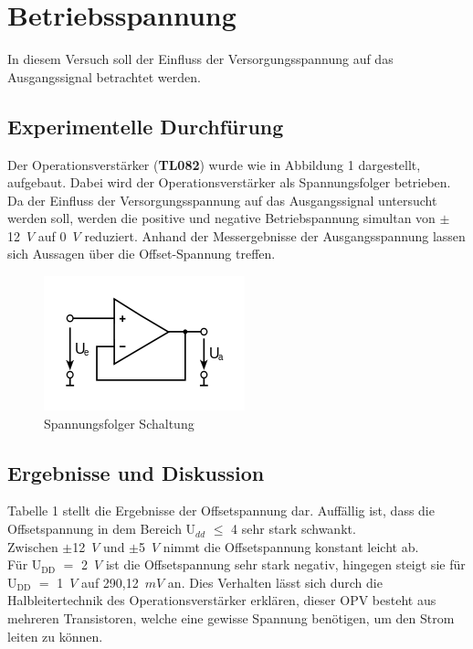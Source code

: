 \section{Betriebsspannung}
In diesem Versuch soll der Einfluss der Versorgungsspannung auf das
Ausgangssignal betrachtet werden. 
\subsection{Experimentelle Durchf\"urung}
\noindent
Der Operationsverst\"arker (\textbf{TL082}) wurde wie in Abbildung 1 dargestellt,  aufgebaut. Dabei wird der Operationsverst\"arker als Spannungsfolger betrieben. Da der Einfluss der Versorgungsspannung auf das Ausgangssignal untersucht werden soll, werden die positive und negative Betriebspannung simultan von $\pm$12~$V$ auf 0~$V$ reduziert. Anhand der Messergebnisse der Ausgangsspannung lassen sich Aussagen \"uber die Offset-Spannung treffen. 

\begin{figure}[!ht]
\begin{center}
\includegraphics[scale=1]{bild/spannungsfolger}
\caption{Spannungsfolger Schaltung}
\end{center}
\end{figure}
\newpage
\subsection{Ergebnisse und Diskussion}
Tabelle 1 stellt die Ergebnisse der Offsetspannung dar. Auff\"allig ist, dass die Offsetspannung in dem Bereich U$_{dd}$ $\leq$ 4 sehr stark schwankt. \\
Zwischen $\pm$12~$V$ und $\pm$5~$V$ nimmt die Offsetspannung konstant leicht ab.\\ 
F\"ur U$_{\text{DD}}$ $=$ 2~$V$ ist die Offsetspannung sehr stark  negativ, hingegen steigt sie f\"ur U$_{\text{DD}}$ $=$ 1~$V$ auf 290,12~$mV$ an. Dies Verhalten l\"asst sich durch die Halbleitertechnik des Operationsverst\"arker erkl\"aren, dieser OPV besteht aus mehreren Transistoren, welche eine gewisse Spannung ben\"otigen, um den Strom leiten zu k\"onnen. 

